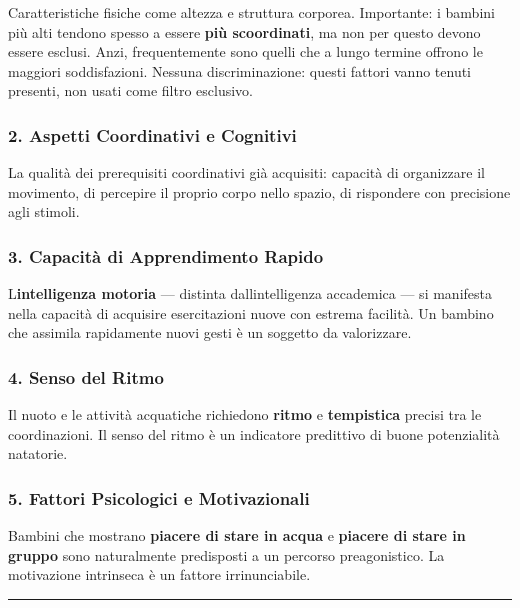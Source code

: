 \documentclass[a4paper,11pt]{article}
\begin{document}
Caratteristiche fisiche come altezza e struttura corporea. Importante: i
bambini più alti tendono spesso a essere \textbf{più scoordinati}, ma
non per questo devono essere esclusi. Anzi, frequentemente sono quelli
che a lungo termine offrono le maggiori soddisfazioni. Nessuna
discriminazione: questi fattori vanno tenuti presenti, non usati come
filtro esclusivo.

\subsubsection{2. Aspetti Coordinativi e
      Cognitivi}\label{aspetti-coordinativi-e-cognitivi}

La qualità dei prerequisiti coordinativi già acquisiti: capacità di
organizzare il movimento, di percepire il proprio corpo nello spazio, di
rispondere con precisione agli stimoli.

\subsubsection{3. Capacità di Apprendimento
      Rapido}\label{capacituxe0-di-apprendimento-rapido}

L\textquotesingle{}\textbf{intelligenza motoria} --- distinta
dall\textquotesingle intelligenza accademica --- si manifesta nella
capacità di acquisire esercitazioni nuove con estrema facilità. Un
bambino che assimila rapidamente nuovi gesti è un soggetto da
valorizzare.

\subsubsection{4. Senso del Ritmo}\label{senso-del-ritmo}

Il nuoto e le attività acquatiche richiedono \textbf{ritmo} e
\textbf{tempistica} precisi tra le coordinazioni. Il senso del ritmo è
un indicatore predittivo di buone potenzialità natatorie.

\subsubsection{5. Fattori Psicologici e
      Motivazionali}\label{fattori-psicologici-e-motivazionali}

Bambini che mostrano \textbf{piacere di stare in acqua} e
\textbf{piacere di stare in gruppo} sono naturalmente predisposti a un
percorso preagonistico. La motivazione intrinseca è un fattore
irrinunciabile.

\begin{center}\rule{0.5\linewidth}{0.5pt}\end{center}
\end{document}
